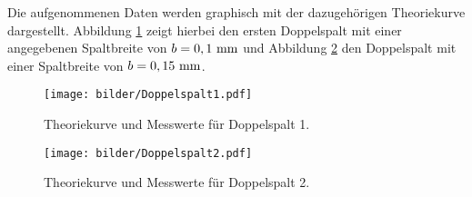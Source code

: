 Die aufgenommenen Daten werden graphisch mit der dazugehörigen Theoriekurve dargestellt.
Abbildung \ref{dopp1} zeigt hierbei den ersten Doppelspalt mit einer angegebenen
Spaltbreite von $b=0,1\,\,\si{\milli\meter}$ und Abbildung \ref{dopp2} den Doppelspalt mit einer
Spaltbreite von $b=0,15\,\,\si{\milli\meter}$.
\begin{figure}[H]
  \centering
  \texttt{[image: bilder/Doppelspalt1.pdf]}
  \caption{Theoriekurve und Messwerte für Doppelspalt 1.}
  \label{dopp1}
\end{figure}
\begin{figure}
  \centering
  \texttt{[image: bilder/Doppelspalt2.pdf]}
  \caption{Theoriekurve und Messwerte für Doppelspalt 2.}
  \label{dopp2}
\end{figure}
